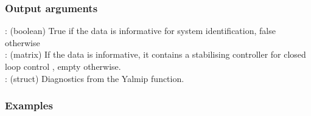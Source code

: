 \subsubsection*{Output arguments}
\textbf{}: (boolean) True if the data is informative for system identification, false otherwise\\
\textbf{}: (matrix) If the data is informative, it contains a stabilising controller  for closed loop control , empty otherwise.\\
\textbf{}: (struct) Diagnostics from the Yalmip  function.


\subsubsection{Examples}